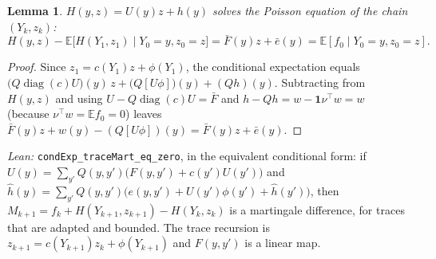 \documentclass[11pt]{article}
\newtheorem{lemma}[theorem]{Lemma}
\theoremstyle{definition}
\theoremstyle{remark}
\newcommand{\E}{\mathbb{E}}
\begin{document}
\begin{lemma}\label{lem:trace-poisson}
$H(y,z) = U(y)z + h(y)$ solves the Poisson equation of the chain $(Y_k, z_k)$:
\[
  H(y,z) - \E\big[H(Y_1, z_1)\mid Y_0 = y, z_0 = z\big] = \bar F(y)z + \bar e(y)
    = \E[f_0\mid Y_0 = y, z_0 = z].
\]
\end{lemma}
\begin{proof}
Since $z_1 = c(Y_1)z + \phi(Y_1)$, the conditional expectation equals
$\big(Q\operatorname{diag}(c)U\big)(y)\,z + \big(Q[U\phi]\big)(y) + (Qh)(y)$. Subtracting from
$H(y,z)$ and using $U - Q\operatorname{diag}(c)U = \bar F$ and $h - Qh = w - \mathbf 1\nu^\top w = w$
(because $\nu^\top w = \E f_0 = 0$) leaves $\bar F(y)z + w(y) - (Q[U\phi])(y) = \bar F(y)z + \bar e(y)$.
\end{proof}
\noindent\emph{Lean:} \texttt{condExp\_traceMart\_eq\_zero}, in the equivalent conditional form:
if $U(y) = \sum_{y'}Q(y,y')\big(F(y,y') + c(y')U(y')\big)$ and
$\hat h(y) = \sum_{y'}Q(y,y')\big(e(y,y') + U(y')\phi(y') + \hat h(y')\big)$, then
$M_{k+1} = f_k + H(Y_{k+1}, z_{k+1}) - H(Y_k, z_k)$ is a martingale difference, for traces that are
adapted and bounded. The trace recursion is $z_{k+1} = c(Y_{k+1})z_k + \phi(Y_{k+1})$ and
$F(y, y')$ is a linear map.
\end{document}
